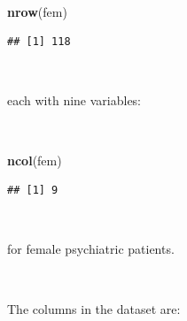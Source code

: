\documentclass[12pt,a4paper]{book}
\newenvironment{Shaded}{\begin{snugshade}}{\end{snugshade}}
\newcommand{\KeywordTok}[1]{\textcolor[rgb]{0.13,0.29,0.53}{\textbf{#1}}}
\newcommand{\NormalTok}[1]{#1}
\theoremstyle{definition}
\theoremstyle{definition}
\theoremstyle{definition}
\theoremstyle{remark}
\begin{document}
~

\begin{Shaded}
\begin{Highlighting}[]
\KeywordTok{nrow}\NormalTok{(fem)}
\end{Highlighting}
\end{Shaded}

\begin{verbatim}
## [1] 118
\end{verbatim}

~

each with nine variables:

~

\begin{Shaded}
\begin{Highlighting}[]
\KeywordTok{ncol}\NormalTok{(fem)}
\end{Highlighting}
\end{Shaded}

\begin{verbatim}
## [1] 9
\end{verbatim}

~

for female psychiatric patients.

~

The columns in the dataset are:

~
\end{document}
